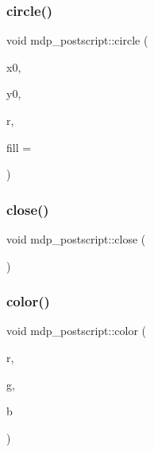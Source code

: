 \mbox{\label{classmdp__postscript_abfa4c3e6cfd19b2ddb190ca9a5f2df02}} 
\subsubsection{\texorpdfstring{circle()}{circle()}}
{\footnotesize\ttfamily void mdp\+\_\+postscript\+::circle (\begin{DoxyParamCaption}\item[{float}]{x0,  }\item[{float}]{y0,  }\item[{float}]{r,  }\item[{int}]{fill = {} }\end{DoxyParamCaption})\hspace{0.3cm}{\ttfamily [inline]}}

\mbox{\label{classmdp__postscript_af41a3aa09549d5acb2b5e9a098f69089}} 
\subsubsection{\texorpdfstring{close()}{close()}}
{\footnotesize\ttfamily void mdp\+\_\+postscript\+::close (\begin{DoxyParamCaption}{ }\end{DoxyParamCaption})\hspace{0.3cm}{\ttfamily [inline]}}

\mbox{\label{classmdp__postscript_ae4c5ce5c229ad7cfef67a689c77acac3}} 
\subsubsection{\texorpdfstring{color()}{color()}}
{\footnotesize\ttfamily void mdp\+\_\+postscript\+::color (\begin{DoxyParamCaption}\item[{float}]{r,  }\item[{float}]{g,  }\item[{float}]{b }\end{DoxyParamCaption})\hspace{0.3cm}{\ttfamily [inline]}}

